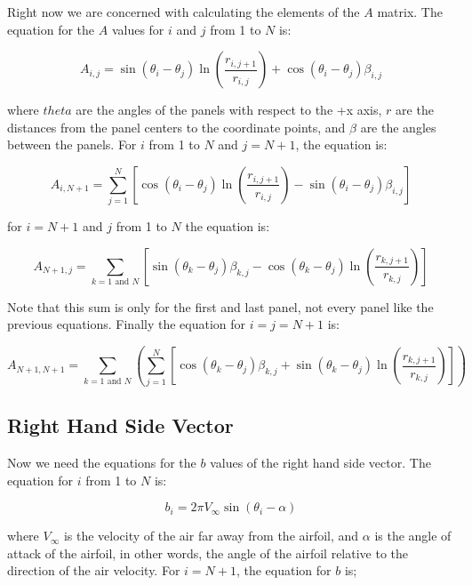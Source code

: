 \documentclass{article}%
\begin{document}
Right now we are concerned with calculating the elements of the $A$ matrix. The equation for the $A$ values for $i$ and $j$ from 1 to $N$ is:

\begin{equation}
	A_{i,j} = \sin(\theta_i-\theta_j) \ln\left(\frac{r_{i,j+1}}{r_{i,j}}\right) + \cos(\theta_i-\theta_j)\beta_{i,j}
\end{equation}

where $theta$ are the angles of the panels with respect to the +x axis, $r$ are the distances from the panel centers to the coordinate points, and $\beta$ are the angles between the panels. For $i$ from 1 to $N$ and $j=N+1$, the equation is:

\begin{equation}
	A_{i,N+1} = \sum_{j=1}^N \left[ \cos(\theta_i-\theta_j) \ln\left(\frac{r_{i,j+1}}{r_{i,j}}\right) - \sin(\theta_i-\theta_j)\beta_{i,j} \right]
\end{equation}

for $i=N+1$ and $j$ from 1 to $N$ the equation is:

\begin{equation}
	A_{N+1,j} = \sum_{k=1 \text{ and } N} \left[ \sin(\theta_k-\theta_j)\beta_{k,j} - \cos(\theta_k-\theta_j) \ln\left(\frac{r_{k,j+1}}{r_{k,j}}\right) \right]
\end{equation}

Note that this sum is only for the first and last panel, not every panel like the previous equations. Finally the equation for $i=j=N+1$ is:

\begin{equation}
	A_{N+1,N+1} = \sum_{k=1 \text{ and } N}  \left(\sum_{j=1}^N \left[ \cos(\theta_k-\theta_j)\beta_{k,j} + \sin(\theta_k-\theta_j) \ln\left(\frac{r_{k,j+1}}{r_{k,j}}\right) \right] \right)
\end{equation}

\subsection*{Right Hand Side Vector}

Now we need the equations for the $b$ values of the right hand side vector. The equation for $i$ from 1 to $N$ is:

\begin{equation}
	b_i = 2\pi V_{\infty} \sin(\theta_i - \alpha)
\end{equation}

where $V_\infty$ is the velocity of the air far away from the airfoil, and $\alpha$ is the angle of attack of the airfoil, in other words, the angle of the airfoil relative to the direction of the air velocity. For $i=N+1$, the equation for $b$ is;
\end{document}
